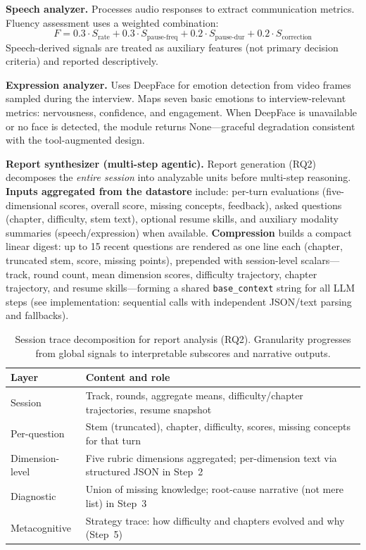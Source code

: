 ﻿\documentclass[final,3p,times,authoryear]{elsarticle}
\begin{document}
\noindent \textbf{Speech analyzer.} Processes audio responses to extract communication metrics. Fluency assessment uses a weighted combination:
\begin{equation}
F = 0.3 \cdot S_{\text{rate}} + 0.3 \cdot S_{\text{pause-freq}} + 0.2 \cdot S_{\text{pause-dur}} + 0.2 \cdot S_{\text{correction}}
\end{equation}
Speech-derived signals are treated as auxiliary features (not primary decision criteria) and reported descriptively.

\noindent \textbf{Expression analyzer.} Uses DeepFace \cite{serengil2020deepface} for emotion detection from video frames sampled during the interview. Maps seven basic emotions to interview-relevant metrics: nervousness, confidence, and engagement. When DeepFace is unavailable or no face is detected, the module returns None---graceful degradation consistent with the tool-augmented design.

\noindent \textbf{Report synthesizer (multi-step agentic).}\label{sec:report_pipeline} Report generation (RQ2) decomposes the \emph{entire session} into analyzable units before multi-step reasoning. \textbf{Inputs aggregated from the datastore} include: per-turn evaluations (five-dimensional scores, overall score, missing concepts, feedback), asked questions (chapter, difficulty, stem text), optional resume skills, and auxiliary modality summaries (speech/expression) when available. \textbf{Compression} builds a compact linear digest: up to 15 recent questions are rendered as one line each (chapter, truncated stem, score, missing points), prepended with session-level scalars---track, round count, mean dimension scores, difficulty trajectory, chapter trajectory, and resume skills---forming a shared \texttt{base\_context} string for all LLM steps (see implementation: sequential calls with independent JSON/text parsing and fallbacks).

\begin{table}[H]
\centering
\caption{Session trace decomposition for report analysis (RQ2). Granularity progresses from global signals to interpretable subscores and narrative outputs.}
\label{tab:report_decomposition}
\footnotesize
\begin{tabularx}{\textwidth}{l Y}
\toprule
\textbf{Layer} & \textbf{Content and role} \\
\midrule
Session & Track, rounds, aggregate means, difficulty/chapter trajectories, resume snapshot \\
Per-question & Stem (truncated), chapter, difficulty, scores, missing concepts for that turn \\
Dimension-level & Five rubric dimensions aggregated; per-dimension text via structured JSON in Step~2 \\
Diagnostic & Union of missing knowledge; root-cause narrative (not mere list) in Step~3 \\
Metacognitive & Strategy trace: how difficulty and chapters evolved and why (Step~5) \\
\bottomrule
\end{tabularx}
\end{table}
\end{document}
